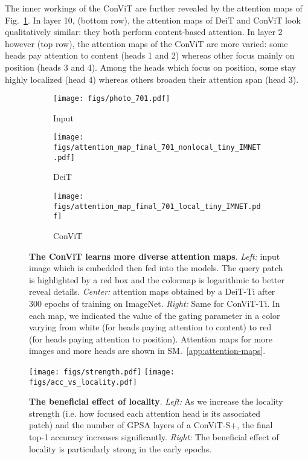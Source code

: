 \documentclass[a4paper,11pt,twocolumn]{article}
\begin{document}
The inner workings of the ConViT are further revealed by the attention maps of Fig.~\ref{fig:maps-final}. In layer 10, (bottom row), the attention maps of DeiT and ConViT look qualitatively similar: they both perform content-based attention. In layer 2 however (top row), the attention maps of the ConViT are more varied: some heads pay attention to content (heads 1 and 2) whereas other focus mainly on position (heads 3 and 4). Among the heads which focus on position, some stay highly localized (head 4) whereas others broaden their attention span (head 3).

\begin{figure}[h!]
    \centering
    \hspace{-1em}
    \begin{subfigure}[b]{.33\columnwidth}
    \texttt{[image: figs/photo\_701.pdf]}
    \caption{Input}
    \end{subfigure}   
    \hspace{-1.3em}
    \begin{subfigure}[b]{.68\columnwidth}
    \texttt{[image: figs/attention\_map\_final\_701\_nonlocal\_tiny\_IMNET.pdf]}
    \caption{DeiT}
    \end{subfigure}
    \par\bigskip
    \begin{subfigure}[b]{.95\columnwidth}
    \texttt{[image: figs/attention\_map\_final\_701\_local\_tiny\_IMNET.pdf]}
    \caption{ConViT}
    \end{subfigure}
    \caption{\textbf{The ConViT learns more diverse attention maps}. \textit{Left:} input image which is embedded then fed into the models. The query patch is highlighted by a red box and the colormap is logarithmic to better reveal details. \textit{Center:} attention maps obtained by a DeiT-Ti after 300 epochs of training on ImageNet. \textit{Right:} Same for ConViT-Ti. In each map, we indicated the value of the gating parameter in a color varying from white (for heads paying attention to content) to red (for heads paying attention to position). Attention maps for more images and more heads are shown in SM.~\ref{app:attention-maps}.}
    \label{fig:maps-final}
\end{figure}


\begin{figure}[t]
    \centering
    \texttt{[image: figs/strength.pdf]}
    \texttt{[image: figs/acc\_vs\_locality.pdf]}
\caption{\textbf{The beneficial effect of locality}. \textit{Left:} As we increase the locality strength (i.e. how focused each attention head is its associated patch) and the number of GPSA layers of a ConViT-S+, the final top-1 accuracy increases significantly. \textit{Right:} The beneficial effect of locality is particularly strong in the early epochs. 
    }
    \label{fig:strength}
\end{figure}
\end{document}
